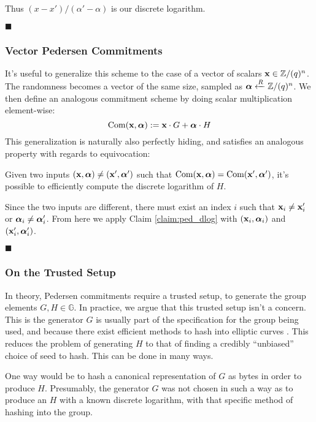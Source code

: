 Thus $(x - x') / (\alpha' - \alpha)$ is our discrete logarithm.

$\blacksquare$

\subsubsection{Vector Pedersen Commitments}

It's useful to generalize this scheme to the case of a vector of scalars
${\textbf{x} \in \mathbb{Z}/(q)^n}$. The randomness becomes a vector of the same
size, sampled as ${\boldsymbol{\alpha} \xleftarrow{R} \mathbb{Z}/(q)^n}$. We then define
an analogous commitment scheme by doing scalar multiplication element-wise:
$$
\text{Com}(\textbf{x}, \boldsymbol{\alpha}) := \textbf{x} \cdot G + \boldsymbol{\alpha} \cdot H
$$
This generalization is naturally also perfectly hiding, and satisfies
an analogous property with regards to equivocation:

\begin{claim}
    \label{claim:ped_vec_dlog}
    Given two inputs $(\textbf{x}, \boldsymbol{\alpha}) \neq (\textbf{x}', \boldsymbol{\alpha}')$ such that
    $\text{Com}(\textbf{x}, \boldsymbol{\alpha}) = \text{Com}(\textbf{x}', \boldsymbol{\alpha}')$, it's possible
    to efficiently compute the discrete logarithm of $H$.
\end{claim}

Since the two inputs are different, there must exist an index $i$
such that $\textbf{x}_i \neq \textbf{x}_i'$ or $\boldsymbol{\alpha}_i \neq \boldsymbol{\alpha}_i'$.
From here we apply Claim \ref{claim:ped_dlog} with $(\textbf{x}_i, \boldsymbol{\alpha}_i)$ and
$(\textbf{x}_i', \boldsymbol{\alpha}'_i)$.

$\blacksquare$

\subsubsection{On the Trusted Setup}

In theory, Pedersen commitments require a trusted setup, to generate
the group elements $G, H \in \mathbb{G}$. In practice, we argue that
this trusted setup isn't a concern. This is the generator $G$
is usually part of the specification for the group being used,
and because there exist
efficient methods to hash into elliptic curves \cite{icart_how_2009}.
This reduces the problem of generating $H$ to that of finding a credibly
``unbiased'' choice of seed to hash. This can be done in many ways.

One way would be to hash a canonical representation of $G$ as bytes in order
to produce $H$. Presumably, the generator $G$ was not chosen in such
a way as to produce an $H$ with a known discrete logarithm, with
that specific method of hashing into the group.

